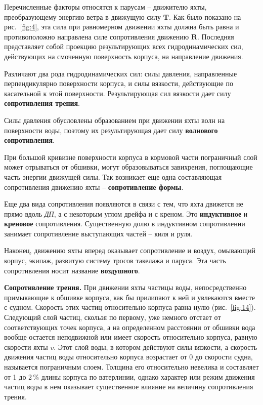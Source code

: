 \documentclass[a4paper, 12pt, twoside, final, book, russian, fittopage, cyremdash]{ncc}
\newcommand{\ve}[1]{\ensuremath{\mathbf{#1}}\xspace}
\newcommand{\ris}[1]{\ref{fig:#1}}
\begin{document}
Перечисленные факторы относятся к парусам \--- движителю яхты, преобразующему энергию ветра в движущую силу \ve T. Как было показано на рис.~\ris{4}, эта сила при равномерном движении яхты должна быть равна и противоположно направлена силе сопротивления движению \ve R. Последняя представляет собой проекцию результирующих всех гидродинамических сил, действующих на смоченную поверхность корпуса, на направление движения.

Различают два рода гидродинамических сил: силы давления, направленные перпендикулярно поверхности корпуса, и силы вязкости, действующие по касательной к этой поверхности. Результирующая сил вязкости дает силу \textbf{сопротивления трения}. 

Силы давления обусловлены образованием при движении яхты волн на поверхности воды, поэтому их результирующая дает силу \textbf{волнового сопротивления}. 

При большой кривизне поверхности корпуса в кормовой части пограничный слой может отрываться от обшивки, могут образовываться завихрения, поглощающие часть энергии движущей силы. Так возникает еще одна составляющая сопротивления движению яхты \--- \textbf{сопротивление формы}.

Еще два вида сопротивления появляются в связи с тем, что яхта движется не прямо вдоль \textit{ДП}, а с некоторым углом дрейфа и с креном. Это \textbf{индуктивное} и \textbf{креновое} сопротивления. Существенную долю в индуктивном сопротивлении занимает сопротивление выступающих частей \--- киля и руля.

Наконец, движению яхты вперед оказывает сопротивление и воздух, омывающий корпус, экипаж, развитую систему тросов такелажа и паруса. Эта часть сопротивления носит название \textbf{воздушного}. 

\textbf{Сопротивление трения.} При движении яхты частицы воды, непосредственно примыкающие к обшивке корпуса, как бы прилипают к ней и увлекаются вместе с судном. Скорость этих частиц относительно корпуса равна нулю (рис.~\ris{14}). Следующий слой частиц, скользя по первому, уже немного отстает от соответствующих точек корпуса, а на определенном расстоянии от обшивки вода вообще остается неподвижной или имеет скорость относительно корпуса, равную скорости яхты $v$. Этот слой воды, в котором действуют силы вязкости, а скорость движения частиц воды относительно корпуса возрастает от 0 до скорости судна, называется пограничным слоем. Толщина его относительно невелика и составляет от 1 до 2\,\% длины корпуса по ватерлинии, однако характер или режим движения частиц воды в нем оказывает существенное влияние на величину сопротивления трения.
\end{document}
